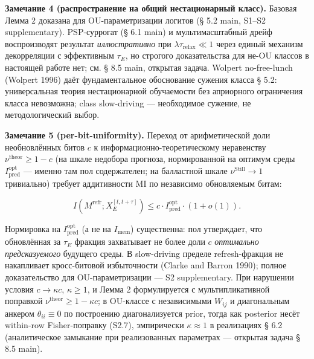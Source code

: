 \documentclass[pdflatex,sn-mathphys-ay]{sn-jnl}
\begin{document}
\textbf{Замечание 4 (распространение на общий нестационарный класс).} Базовая Лемма 2 доказана для OU-параметризации логитов (§ 5.2 main, S1--S2 supplementary). PSP-суррогат (§ 6.1 main) и мультимасштабный дрейф воспроизводят результат \emph{иллюстративно} при \(\lambda \tau_{\text{relax}} \ll 1\) через единый механизм декорреляции с эффективным \(\tau_E\), но строгого доказательства для не-OU классов в настоящей работе нет; см. § 8.5 main, открытая задача. Wolpert no-free-lunch (Wolpert 1996) даёт фундаментальное обоснование сужения класса § 5.2: универсальная теория нестационарной обучаемости без априорного ограничения класса невозможна; class slow-driving --- необходимое сужение, не методологический выбор.



\textbf{Замечание 5 (per-bit-uniformity).} Переход от арифметической доли необновлённых битов \(c\) к информационно-теоретическому неравенству \(\nu^{\text{theor}} \ge 1 - c\) (на шкале недобора прогноза, нормированной на оптимум среды \(I_{\text{pred}}^{\text{opt}}\) --- именно там пол содержателен; на балластной шкале \(\nu^{\text{Still}} \to 1\) тривиально) требует аддитивности MI по независимо обновляемым битам:



\[I(M^{\text{refr}}; X_E^{[t,t+\tau]}) \le c \cdot I_{\text{pred}}^{\text{opt}} \cdot (1+o(1)).\]



Нормировка на \(I_{\text{pred}}^{\text{opt}}\) (а не на \(I_{\text{mem}}\)) существенна: пол утверждает, что обновлённая за \(\tau_E\) фракция захватывает не более доли \(c\) \emph{оптимально предсказуемого} будущего среды. В slow-driving пределе refresh-фракция не накапливает кросс-битовой избыточности (Clarke and Barron 1990); полное доказательство для OU-параметризации --- S2 supplementary. При нарушении условия \(c \to \kappa c\), \(\kappa \ge 1\), и Лемма 2 формулируется с мультипликативной поправкой \(\nu^{\text{theor}} \ge 1 - \kappa c\); в OU-классе с независимыми \(W_{ij}\) и диагональным анкером \(\theta_{ii} \equiv 0\) по построению диагонализуется prior, тогда как posterior несёт within-row Fisher-поправку (S2.7), эмпирически \(\kappa \approx 1\) в реализациях § 6.2 (аналитическое замыкание при реализованных параметрах --- открытая задача § 8.5 main).
\end{document}
